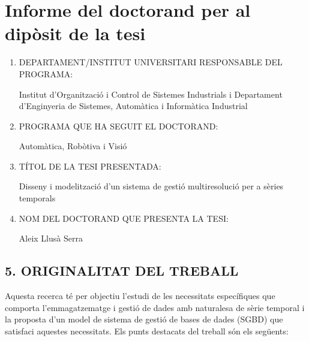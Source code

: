 \documentclass{scrartcl}
\begin{document}
\section*{Informe del doctorand per al dipòsit de la tesi}

\begin{enumerate}
\item DEPARTAMENT/INSTITUT UNIVERSITARI RESPONSABLE DEL PROGRAMA:

Institut  d’Organització i Control de Sistemes Industrials i Departament d'Enginyeria de Sistemes, Automàtica i Informàtica Industrial


\item PROGRAMA QUE HA SEGUIT EL DOCTORAND:

Automàtica, Robòtiva i Visió


\item  TÍTOL DE LA TESI PRESENTADA:


Disseny i modelització d'un sistema de gestió multiresolució per a sèries temporals




\item NOM DEL DOCTORAND QUE PRESENTA LA TESI:

Aleix Llusà Serra

\end{enumerate}





\subsection*{5. ORIGINALITAT DEL TREBALL}


Aquesta recerca té per objectiu l'estudi de les necessitats
específiques que comporta l'emmagatzematge i gestió de dades amb
naturalesa de sèrie temporal i la proposta d'un model de sistema de
gestió de bases de dades (SGBD) que satisfaci aquestes
necessitats. Els punts destacats del treball són els següents:
\end{document}
